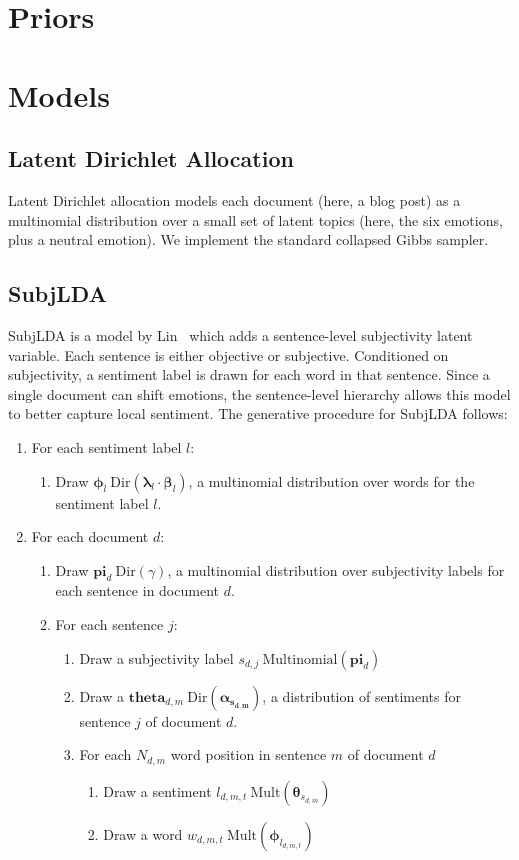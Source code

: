 \documentclass{article}
\begin{document}
\section{Priors}

\section{Models}
\subsection{Latent Dirichlet Allocation}
Latent Dirichlet allocation models each document (here, a blog post)
as a multinomial distribution over a small set of latent topics
(here, the six emotions, plus a neutral emotion). We implement the
standard collapsed Gibbs sampler.

\subsection{SubjLDA}
SubjLDA is a model by Lin~\citep{lin03} which adds a sentence-level
subjectivity latent variable. Each sentence is either objective or
subjective. Conditioned on subjectivity, a sentiment label is drawn
for each word in that sentence. Since a single document can shift
emotions, the sentence-level hierarchy allows this model to better
capture local sentiment. The generative procedure for SubjLDA follows:

\begin{enumerate}
\item For each sentiment label $l$:
\begin{enumerate}
\item Draw $\mathbf{\phi}_l ~ \mbox{Dir}(\mathbf{\lambda}_l \cdot \mathbf{\beta}_l)$, a multinomial distribution over words for the sentiment label $l$.
\end{enumerate}
\item For each document $d$:
\begin{enumerate}
\item Draw $\mathbf{pi}_d ~ \mbox{Dir}(\gamma)$, a multinomial distribution over subjectivity labels for each sentence in document $d$.
\item For each sentence $j$:
\begin{enumerate}
\item Draw a subjectivity label $s_{d,j} ~ \mbox{Multinomial}(\mathbf{pi}_d)$
\item Draw a $\mathbf{theta}_{d,m} ~ \mbox{Dir}(\mathbf{\alpha_{s_{d,m}}})$, a distribution of sentiments for sentence $j$ of document $d$.
\item For each $N_{d,m}$ word position in sentence $m$ of document $d$
\begin{enumerate}
\item Draw a sentiment $l_{d,m,t} ~ \mbox{Mult}(\mathbf{\theta}_{s_{d,m}})$
\item Draw a word $w_{d,m,t} ~ \mbox{Mult}(\mathbf{\phi}_{l_{d,m,t}})$
\end{enumerate}
\end{enumerate}
\end{enumerate}
\end{enumerate}
\end{document}
